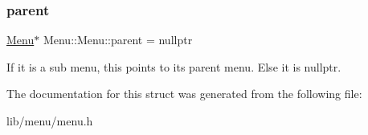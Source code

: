 \subsubsection{\texorpdfstring{parent}{parent}}
{\footnotesize\ttfamily \hyperlink{struct_menu_1_1_menu}{Menu}$\ast$ Menu\+::\+Menu\+::parent = nullptr}

If it is a sub menu, this points to its parent menu. Else it is nullptr. 

The documentation for this struct was generated from the following file\+:\begin{DoxyCompactItemize}
\item 
lib/menu/menu.\+h\end{DoxyCompactItemize}
